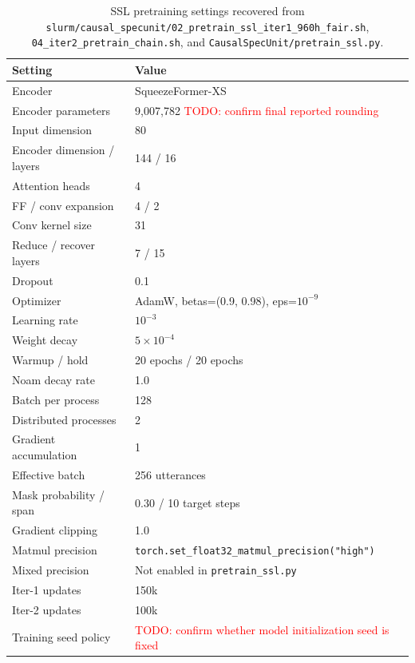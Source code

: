 \documentclass{article}
\newcommand{\todo}[1]{\textcolor{red}{TODO: #1}}
\newcommand{\code}[1]{\texttt{#1}}
\begin{document}
\begin{table}[h]
\centering
\small
\caption{SSL pretraining settings recovered from
\code{slurm/causal\_specunit/02\_pretrain\_ssl\_iter1\_960h\_fair.sh},
\code{04\_iter2\_pretrain\_chain.sh}, and \code{CausalSpecUnit/pretrain\_ssl.py}.}
\begin{tabular}{@{}ll@{}}
\toprule
Setting & Value \\
\midrule
Encoder & SqueezeFormer-XS \\
Encoder parameters & 9,007,782 \todo{confirm final reported rounding} \\
Input dimension & 80 \\
Encoder dimension / layers & 144 / 16 \\
Attention heads & 4 \\
FF / conv expansion & 4 / 2 \\
Conv kernel size & 31 \\
Reduce / recover layers & 7 / 15 \\
Dropout & 0.1 \\
Optimizer & AdamW, betas=(0.9, 0.98), eps=$10^{-9}$ \\
Learning rate & $10^{-3}$ \\
Weight decay & $5\times10^{-4}$ \\
Warmup / hold & 20 epochs / 20 epochs \\
Noam decay rate & 1.0 \\
Batch per process & 128 \\
Distributed processes & 2 \\
Gradient accumulation & 1 \\
Effective batch & 256 utterances \\
Mask probability / span & 0.30 / 10 target steps \\
Gradient clipping & 1.0 \\
Matmul precision & \code{torch.set\_float32\_matmul\_precision("high")} \\
Mixed precision & Not enabled in \code{pretrain\_ssl.py} \\
Iter-1 updates & 150k \\
Iter-2 updates & 100k \\
Training seed policy & \todo{confirm whether model initialization seed is fixed} \\
\bottomrule
\end{tabular}
\end{table}
\end{document}
